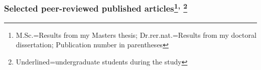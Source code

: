 \documentclass[letter,10pt]{article}
\begin{document}



\subsubsection*{Selected peer-reviewed published articles\footnote{M.Sc.=Results from my Masters thesis; Dr.rer.nat.=Results from my doctoral dissertation; Publication number in parentheses}\textsuperscript{,} \footnote{Underlined=undergraduate students during the study}}%
\end{document}
